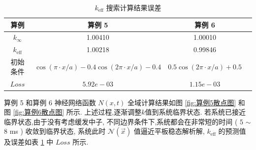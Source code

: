 \documentclass{Sichuan Normal University}
\begin{document}
\begin{table}[H]
    \caption{$k_{\text{eff}}$ 搜索计算结果误差}
    \centering
    \begin{tabular}{cccc}
        \toprule
        \textbf{算例} & \textbf{算例 5} & \textbf{算例 6} \\
        \midrule
        $k_{\infty}$ & 1.00410 & 1.00010 \\
        $k_{\mathrm{eff}}$ & 1.00218 & 0.99846 \\
        初始条件 & $\cos (\pi \cdot x / a)-0.4 \cos (2 \pi \cdot x / a)-0.4$ & $0.5 \cos (2 \pi \cdot x / a)+0.5$ \\
        $Loss$ & $5.92e-03$ & $1.15e-03$ \\
      \bottomrule
    \end{tabular}
    \label{tab:k_eff_error}
\end{table}

算例 5 和算例 6 神经网络函数 $N(x, t)$ 全域计算结果如图 \ref{fig:算例5散点图} 和 图 \ref{fig:算例6散点图} 所示.
上述过程,逐渐调整$k$值到系统临界状态. 若系统已接近临界状态,由于没有考虑缓发中子, 不同边界条件下,系统都会在非常短的时间
( 5 $\sim$ 8 ms ) 收敛到临界状态, 系统此时 $\mathcal{N}(\vec{x})$ 值逼近平板稳态解析解, 
$k_{\text{eff}}$ 的预测值及误差如表 \ref{tab:k_eff_error} 中 $Loss$ 所示.
\end{document}
